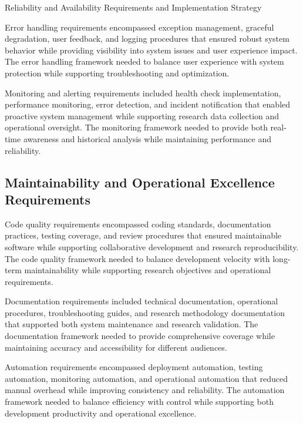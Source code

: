 \begin{table}[H]
\centering
\caption{Reliability and Availability Requirements and Implementation Strategy}
\label{tab:reliability-availability-requirements}
\end{table}

Error handling requirements encompassed exception management, graceful degradation, user feedback, and logging procedures that ensured robust system behavior while providing visibility into system issues and user experience impact. The error handling framework needed to balance user experience with system protection while supporting troubleshooting and optimization.

Monitoring and alerting requirements included health check implementation, performance monitoring, error detection, and incident notification that enabled proactive system management while supporting research data collection and operational oversight. The monitoring framework needed to provide both real-time awareness and historical analysis while maintaining performance and reliability.

\subsection{Maintainability and Operational Excellence Requirements}

Code quality requirements encompassed coding standards, documentation practices, testing coverage, and review procedures that ensured maintainable software while supporting collaborative development and research reproducibility. The code quality framework needed to balance development velocity with long-term maintainability while supporting research objectives and operational requirements.

Documentation requirements included technical documentation, operational procedures, troubleshooting guides, and research methodology documentation that supported both system maintenance and research validation. The documentation framework needed to provide comprehensive coverage while maintaining accuracy and accessibility for different audiences.

Automation requirements encompassed deployment automation, testing automation, monitoring automation, and operational automation that reduced manual overhead while improving consistency and reliability. The automation framework needed to balance efficiency with control while supporting both development productivity and operational excellence.

